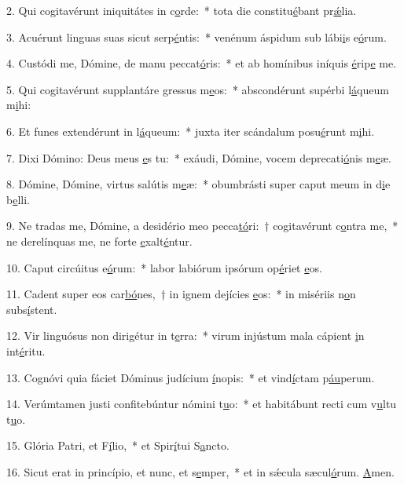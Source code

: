2. Qui cogitavérunt iniquitátes in c\uline{o}rde:~* tota die constitu\uline{é}bant pr\uline{ǽ}lia.\par 
3. Acuérunt linguas suas sicut serp\uline{é}ntis:~* venénum áspidum sub lábi\uline{i}s e\uline{ó}rum.\par 
4. Custódi me, Dómine, de manu peccat\uline{ó}ris:~* et ab homínibus iníquis \uline{é}rip\uline{e} me.\par 
5. Qui cogitavérunt supplantáre gressus m\uline{e}os:~* abscondérunt supérbi l\uline{á}queum m\uline{i}hi:\par 
6. Et funes extendérunt in l\uline{á}queum:~* juxta iter scándalum posu\uline{é}runt m\uline{i}hi.\par 
7. Dixi Dómino: Deus meus \uline{e}s tu:~* exáudi, Dómine, vocem deprecati\uline{ó}nis m\uline{e}æ.\par 
8. Dómine, Dómine, virtus salútis m\uline{e}æ:~* obumbrásti super caput meum in d\uline{i}e b\uline{e}lli.\par 
9. Ne tradas me, Dómine, a desidério meo pecca\uline{tó}ri:~† cogitavérunt c\uline{o}ntra me,~* ne derelínquas me, ne forte \uline{e}xalt\uline{é}ntur.\par 
10. Caput circúitus e\uline{ó}rum:~* labor labiórum ipsórum op\uline{é}riet \uline{e}os.\par 
11. Cadent super eos car\uline{bó}nes,~† in ignem dejícies \uline{e}os:~* in misériis n\uline{o}n subs\uline{í}stent.\par 
12. Vir linguósus non dirigétur in t\uline{e}rra:~* virum injústum mala cápient \uline{i}n int\uline{é}ritu.\par 
13. Cognóvi quia fáciet Dóminus judícium \uline{í}nopis:~* et vind\uline{í}ctam p\uline{áu}perum.\par 
14. Verúmtamen justi confitebúntur nómini t\uline{u}o:~* et habitábunt recti cum v\uline{u}ltu t\uline{u}o.\par 
15. Glória Patri, et F\uline{í}lio,~* et Spir\uline{í}tui S\uline{a}ncto.\par 
16. Sicut erat in princípio, et nunc, et s\uline{e}mper,~* et in sǽcula sæcul\uline{ó}rum. \uline{A}men.\par 
